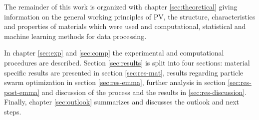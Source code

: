 The remainder of this work is organized with chapter 
\ref{sec:theoretical} giving 
information on the general working principles of PV, the structure, characteristics and properties of materials which were used and computational, statistical and machine learning methods for data processing. 

In chapter \ref{sec:exp} and \ref{sec:comp} the experimental and computational procedures are described. 
Section \ref{sec:results} is split into four sections: material specific results are presented in section \ref{sec:res-mat}, results regarding particle swarm optimization in section \ref{sec:res-emma}, further analysis in section \ref{sec:res-post-emma} and discussion of the process and the results in \ref{sec:res-discussion}.
Finally, chapter \ref{sec:outlook} summarizes and discusses the outlook and next steps.

